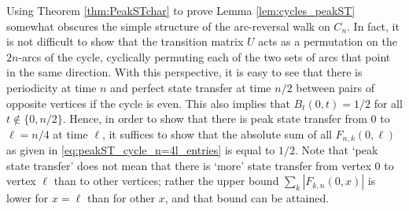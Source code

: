 \documentclass{article}
\numberwithin{equation}{section}
\begin{document}
Using Theorem \ref{thm:PeakSTchar} to prove Lemma \ref{lem:cycles_peakST} somewhat obscures the simple structure of the arc-reversal walk on $C_n$. In fact, it is not difficult to show that the transition matrix $U$ acts as a permutation on the $2n$-arcs of the cycle, cyclically permuting each of the two sets of arcs that point in the same direction. With this perspective, it is easy to see that there is periodicity at time $n$ and perfect state transfer at time $n/2$ between pairs of opposite vertices if the cycle is even. This also implies that $B_t(0,t) = 1/2$ for all $t \notin \{0,n/2\}$. Hence, in order to show that there is peak state transfer from $0$ to $\ell = n/4$ at time $\ell$, it suffices to show that the absolute sum of all $F_{n,k}(0,\ell)$ as given in \eqref{eq:peakST_cycle_n=4l_entries} is equal to $1/2$. Note that `peak state transfer' does not mean that there is `more' state transfer from vertex $0$ to vertex $\ell$ than to other vertices; rather the upper bound $\sum_{k}|F_{k,n}(0,x)|$ is lower for $x = \ell$ than for other $x$, and that bound can be attained.
\end{document}
